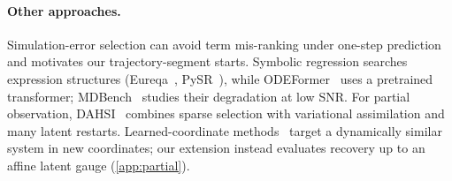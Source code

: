 \paragraph{Other approaches.} Simulation-error selection can avoid term mis-ranking under one-step prediction~\citep{piroddi2003simulation} and motivates our trajectory-segment starts. Symbolic regression searches expression structures (Eureqa~\citep{schmidt2009distilling}, PySR~\citep{cranmer2023pysr}), while ODEFormer~\citep{dascoli2024odeformer} uses a pretrained transformer; MDBench~\citep{mdbench2025} studies their degradation at low SNR. For partial observation, DAHSI~\citep{ribera2022dahsi} combines sparse selection with variational assimilation and many latent restarts. Learned-coordinate methods~\citep{champion2019coordinates,bakarji2023delay} target a dynamically similar system in new coordinates; our extension instead evaluates recovery up to an affine latent gauge (\cref{app:partial}).
